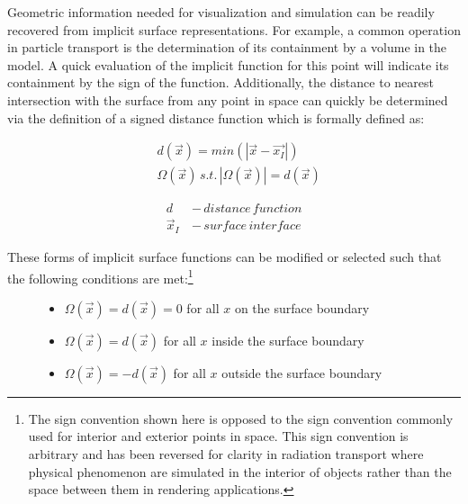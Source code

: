 Geometric information needed for visualization and simulation can be
readily recovered from implicit surface representations. For example, a common
operation in particle transport is the determination of its containment by a
volume in the model. A quick evaluation of the implicit function for this point
will indicate its containment by the sign of the function.
Additionally, the distance to nearest intersection with the surface from any
point in space can quickly be determined via the definition of a signed distance
function which is formally defined as:

\begin{align} \label{eq:sdf}
  & d(\vec{x}) = min(|\vec{x} - \vec{x_{I}}|) \\
  & \Omega(\vec{x})  \,s.t.  \, |\Omega(\vec{x})| = d(\vec{x})
\end{align}

\begin{align}
  d \, &- \, distance \, function \\
  \vec{x}_{I} \, &- \,surface \, interface
\end{align}

\noindent

\setcounter{footnote}{1}
These forms of implicit surface functions can be modified or selected such that the following
conditions are met:\footnote{The sign convention shown here is opposed to the
  sign convention commonly used for interior and exterior points in space. This
  sign convention is arbitrary and has been reversed for clarity in radiation
  transport where physical phenomenon are simulated in the interior of objects
  rather than the space between them in rendering applications.}

\begin{figure}[H]
  \begin{center}
      \begin{itemize}
      \item $ \Omega(\vec{x}) = d(\vec{x}) = 0 $ for all $x$ on the surface boundary
      \item $ \Omega(\vec{x}) = d(\vec{x}) $ for all $x$ inside the surface boundary
      \item $ \Omega(\vec{x}) = -d(\vec{x}) $ for all $x$ outside the surface boundary
      \end{itemize}
  \end{center}
\end{figure}

